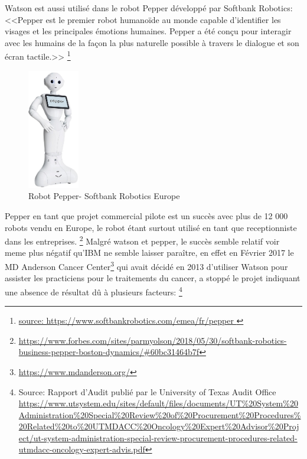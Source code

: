Watson est aussi utilisé dans le robot Pepper développé par Softbank Robotics:
<<Pepper est le premier robot humanoïde au monde capable d'identifier les visages et
les principales émotions humaines. Pepper a été conçu pour interagir avec
les humains de la façon la plus naturelle possible à travers le dialogue et son écran tactile.>>
\footnote{\url{ source: https://www.softbankrobotics.com/emea/fr/pepper }} \newline

\begin{figure}[H]
    \centering
    \includegraphics[width=0.2\textwidth]{Images/pepper}
    \caption{Robot Pepper- Softbank Robotics Europe}
    \label{fig:pepperrobot}
\end{figure}

Pepper en tant que projet commercial pilote est un succès avec plus de 12 000 robots vendu en
Europe, le robot étant surtout utilisé en tant que receptionniste dans les entreprises.
\footnote{\url{https://www.forbes.com/sites/parmyolson/2018/05/30/softbank-robotics-business-pepper-boston-dynamics/\#60bc31464b7f}}
\newline
Malgré watson et pepper, le succès semble relatif voir meme plus négatif qu'IBM ne semble laisser paraître,
en effet en Février 2017 le MD Anderson Cancer Center\footnote{\url{https://www.mdanderson.org/}}
qui avait décidé en 2013 d'utiliser Watson pour assister les practiciens pour le traitements
du cancer, a stoppé le projet indiquant une absence de résultat dû à plusieurs facteurs:
\footnote{Source: Rapport d'Audit publié par le University of Texas Audit Office
    \url{https://www.utsystem.edu/sites/default/files/documents/UT\%20System\%20Administration\%20Special\%20Review\%20of\%20Procurement\%20Procedures\%20Related\%20to\%20UTMDACC\%20Oncology\%20Expert\%20Advisor\%20Project/ut-system-administration-special-review-procurement-procedures-related-utmdacc-oncology-expert-advis.pdf}}
\newline

